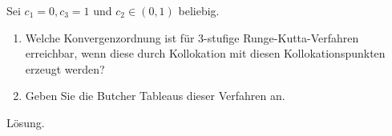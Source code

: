 \begin{exercise}
Sei $c_1 = 0, c_3 = 1$ und $c_2 \in (0,1)$ beliebig.
\begin{enumerate}[label = \textbf{\alph*)}]
  \item Welche Konvergenzordnung ist für 3-stufige Runge-Kutta-Verfahren erreichbar,
  wenn diese durch Kollokation mit diesen Kollokationspunkten erzeugt werden?
  \item Geben Sie die Butcher Tableaus dieser Verfahren an.
\end{enumerate}
\end{exercise}
\begin{solution}
Lösung.
\end{solution}
